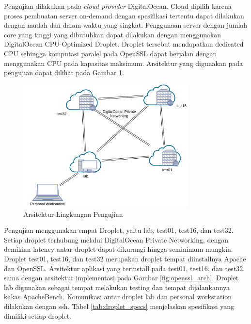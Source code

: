 Pengujian dilakukan pada \textit{cloud provider} DigitalOcean. Cloud dipilih karena proses pembuatan server on-demand dengan spesifikasi tertentu dapat dilakukan dengan mudah dan dalam waktu yang singkat. Penggunaan server dengan jumlah core yang tinggi yang dibutuhkan dapat dilakukan dengan menggunakan DigitalOcean CPU-Optimized Droplet. Droplet tersebut mendapatkan dedicated CPU sehingga komputasi paralel pada OpenSSL dapat berjalan dengan menggunakan CPU pada kapasitas maksimum. Arsitektur yang digunakan pada pengujian dapat dilihat pada Gambar \ref{fig:testing_arch}.

\begin{figure}[h]
  \centering
  \includegraphics[width=0.8\textwidth]{resources/ch-4/testing_arch.png}
  \caption{Arsitektur Lingkungan Pengujian}
  \label{fig:testing_arch}
\end{figure}

Pengujian menggunakan empat Droplet, yaitu lab, test01, test16, dan test32. Setiap droplet terhubung melalui DigitalOcean Private Networking, dengan demikian latency antar droplet dapat dikurangi hingga seminimum mungkin. Droplet test01, test16, dan test32 merupakan droplet tempat diinstallnya Apache dan OpenSSL. Arsitektur aplikasi yang terinstall pada test01, test16, dan test32 sama dengan arsitektur implementasi pada Gambar \ref{fig:openssl_arch}. Droplet lab digunakan sebagai tempat melakukan testing dan tempat dijalankannya kakas ApacheBench. Komunikasi antar droplet lab dan personal workstation dilakukan dengan ssh. Tabel \ref{tab:droplet_specs} menjelaskan spesifikasi yang dimiliki setiap droplet.

